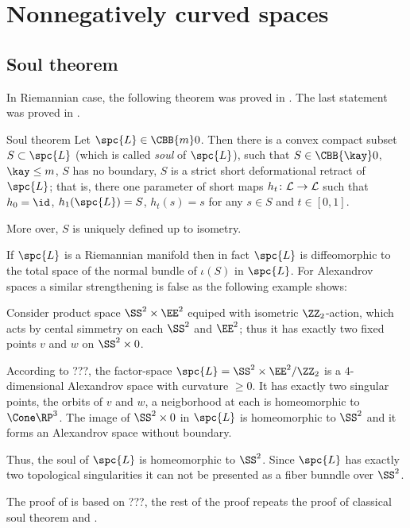 \chapter{Nonnegatively curved spaces}


\section{Soul theorem}

In Riemannian case, the following theorem was proved in \cite{cheeger-gromoll-soul}.
The last statement was proved in \cite{sharafutdinov}.

\begin{thm}{Soul theorem}
Let $\spc{L}\in\CBB{m}0$. 
Then there is a convex compact subset $S\subset \spc{L}$ (which is called \emph{soul} of $\spc{L}$), such that  $S\in\CBB{\kay}0$, $\kay\le m$,
$S$ has no boundary,
$S$ is a strict short deformational retract of $\spc{L}$; that is, there one parameter of short maps $h_t\:\spc{L}\to \spc{L}$ such that $h_0=\id$, $h_1(\spc{L})=S$, $h_t(s)=s$ for any $s\in S$ and $t\in[0,1]$.

More over, $S$ is uniquely defined up to isometry.
\end{thm}

If $\spc{L}$ is a Riemannian manifold then in fact
$\spc{L}$ is diffeomorphic to the total space of the normal bundle of $\iota(S)$ in $\spc{L}$. 
For Alexandrov spaces a similar strengthening is false as the following example shows:

 Consider product space $\SS^2\times \EE^2$ equiped with isometric $\ZZ_2$-action, which acts by cental simmetry on each $\SS^2$ and $\EE^2$; thus it has exactly two fixed points $v$ and $w$ on $\SS^2\times 0$.

According to ???,
the factor-space $\spc{L}=\SS^2\times \EE^2/\ZZ_2$ is a $4$-dimensional Alexandrov space with curvature $\ge 0$.
It has exactly two singular points, the orbits of $v$ and $w$, a neigborhood at each is homeomorphic to $\Cone\RP^3$.
The image of $\SS^2\times 0$ in $\spc{L}$ is homeomorphic to $\SS^2$ and it forms an Alexandrov space without boundary.

Thus, the soul of $\spc{L}$ is homeomorphic to $\SS^2$. 
Since $\spc{L}$ has exactly two topological singularities it can not be presented as a fiber bunndle over $\SS^2$. 

\smallskip

The proof of is based on ???,
the rest of the proof repeats the proof of classical soul theorem \cite{cheeger-gromoll-soul} and \cite{sharafutdinov}.

